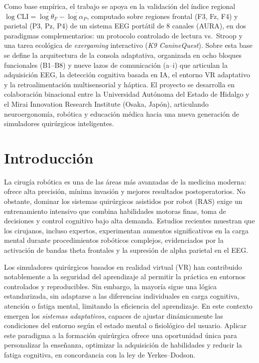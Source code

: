 \documentclass[12pt]{article}
\begin{document}
Como base empírica, el trabajo se apoya en la validación del
índice regional
$\log\mathrm{CLI}=\overline{\log\theta_F}-\overline{\log\alpha_P}$,
computado sobre regiones frontal (F3, Fz, F4) y parietal
(P3, Pz, P4) de un sistema EEG portátil de 8 canales (AURA), en
dos paradigmas complementarios: un protocolo controlado de
lectura vs.\ Stroop y una tarea ecológica de \textit{exergaming}
interactivo (\textit{K9 CanineQuest}). Sobre esta base se define
la arquitectura de la consola adaptativa, organizada en ocho
bloques funcionales (B1--B8) y nueve lazos de comunicación (a--i)
que articulan la adquisición EEG, la detección cognitiva basada
en IA, el entorno VR adaptativo y la retroalimentación
multisensorial y háptica. El proyecto se desarrolla en
colaboración binacional entre la Universidad Autónoma del Estado
de Hidalgo y el Mirai Innovation Research Institute
(Osaka, Japón), articulando neuroergonomía, robótica y educación
médica hacia una nueva generación de simuladores quirúrgicos
inteligentes.


\section{Introducción}

La cirugía robótica es una de las áreas más avanzadas de la
medicina moderna: ofrece alta precisión, mínima invasión y mejores
resultados postoperatorios. No obstante, dominar los sistemas
quirúrgicos asistidos por robot (RAS) exige un entrenamiento
intensivo que combina habilidades motoras finas, toma de
decisiones y control cognitivo bajo alta demanda. Estudios
recientes muestran que los cirujanos, incluso expertos,
experimentan aumentos significativos en la carga mental durante
procedimientos robóticos complejos, evidenciados por la
activación de bandas theta frontales y la supresión de alpha
parietal en el EEG.

Los simuladores quirúrgicos basados en realidad virtual (VR) han
contribuido notablemente a la seguridad del aprendizaje al
permitir la práctica en entornos controlados y reproducibles. Sin
embargo, la mayoría sigue una lógica estandarizada, sin adaptarse
a las diferencias individuales en carga cognitiva, atención o
fatiga mental, limitando la eficiencia del aprendizaje. En este
contexto emergen los \textit{sistemas adaptativos}, capaces de
ajustar dinámicamente las condiciones del entorno según el estado
mental o fisiológico del usuario. Aplicar este paradigma a la
formación quirúrgica ofrece una oportunidad única para
personalizar la enseñanza, optimizar la adquisición de habilidades
y reducir la fatiga cognitiva, en concordancia con la ley de
Yerkes--Dodson.
\end{document}

